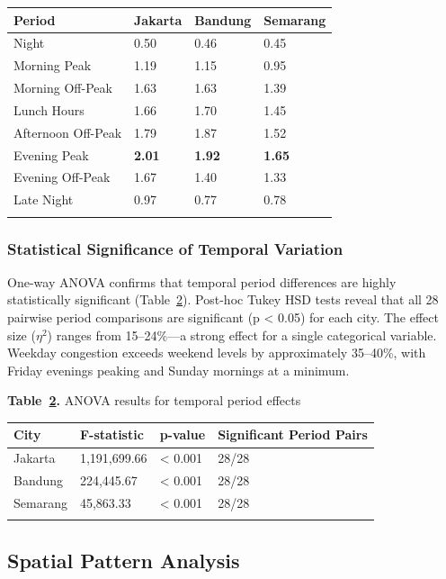 \documentclass[12pt,a4paper]{article}
\begin{document}
\begin{longtable}[]{@{}llll@{}}
\toprule\noalign{}
Period & Jakarta & Bandung & Semarang \\
\midrule\noalign{}
\endhead
\bottomrule\noalign{}
\endlastfoot
Night & 0.50 & 0.46 & 0.45 \\
Morning Peak & 1.19 & 1.15 & 0.95 \\
Morning Off-Peak & 1.63 & 1.63 & 1.39 \\
Lunch Hours & 1.66 & 1.70 & 1.45 \\
Afternoon Off-Peak & 1.79 & 1.87 & 1.52 \\
Evening Peak & \textbf{2.01} & \textbf{1.92} & \textbf{1.65} \\
Evening Off-Peak & 1.67 & 1.40 & 1.33 \\
Late Night & 0.97 & 0.77 & 0.78 \\
\label{tab:table6_meanjam}
\end{longtable}

\subsubsection{Statistical Significance of Temporal Variation}

One-way ANOVA confirms that temporal period differences are highly statistically significant (Table~\ref{tab:table_anova}). Post-hoc Tukey HSD tests reveal that all 28 pairwise period comparisons are significant (p < 0.05) for each city. The effect size ($\eta^2$) ranges from 15--24\%---a strong effect for a single categorical variable. Weekday congestion exceeds weekend levels by approximately 35--40\%, with Friday evenings peaking and Sunday mornings at a minimum.

\textbf{Table~\ref{tab:table_anova}.} ANOVA results for temporal period effects

\begin{longtable}[]{@{}llll@{}}
\toprule\noalign{}
City & F-statistic & p-value & Significant Period Pairs \\
\midrule\noalign{}
\endhead
\bottomrule\noalign{}
\endlastfoot
Jakarta & 1,191,699.66 & < 0.001 & 28/28 \\
Bandung & 224,445.67 & < 0.001 & 28/28 \\
Semarang & 45,863.33 & < 0.001 & 28/28 \\
\label{tab:table_anova}
\end{longtable}

\subsection{Spatial Pattern Analysis}
\end{document}
